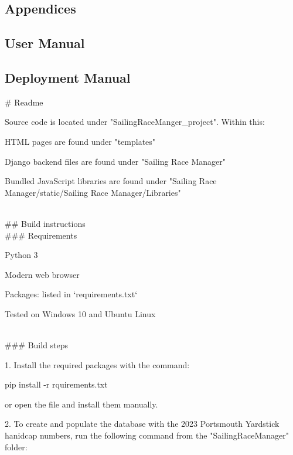 \documentclass{l4proj}
\begin{document}
%
% 

\begin{appendices}

\chapter{Appendices}

\section{User Manual}


\section{Deployment Manual}
\# Readme

Source code is located under "SailingRaceManger\_project". Within this:

HTML pages are found under "templates"

Django backend files are found under "Sailing Race Manager"

Bundled JavaScript libraries are found under "Sailing Race Manager/static/Sailing Race Manager/Libraries"

\hfill\\
\#\# Build instructions
\hfill\\
\#\#\# Requirements

Python 3

Modern web browser

Packages: listed in `requirements.txt` 

Tested on Windows 10 and Ubuntu Linux

\hfill\\
\#\#\# Build steps

1. Install the required packages with the command:

	pip install -r rquirements.txt

or open the file and install them manually.

2. To create and populate the database with the 2023 Portsmouth Yardstick hanidcap numbers, run the following command from the "SailingRaceManager" folder:


\end{appendices}
\end{document}
